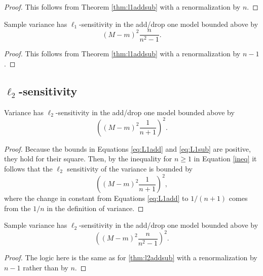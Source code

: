 \documentclass[11pt]{scrartcl} %
\begin{document}
 \begin{proof}
This follows from Theorem \ref{thm:l1addsub} with a renormalization by $n$.
\end{proof}

 \begin{corollary}
 \label{cor:l1addsub}
	Sample variance has $\ell_1$-sensitivity in the add/drop one model bounded above by
	$$\left( M-m \right)^2 \frac{n}{n^2 - 1}. $$
 \end{corollary}
 
 \begin{proof}
This follows from Theorem \ref{thm:l1addsub} with a renormalization by $n-1$.
\end{proof}

\subsection{$\ell_2$-sensitivity}

\begin{theorem}
\label{thm:l2addsub}
Variance has $\ell_2$-sensitivity in the add/drop one model bounded above by
	$$ \left( \left( M-m \right)^2 \frac{1}{n+1} \right)^2.$$
\end{theorem}

\begin{proof}
Because the bounds in Equations \ref{eq:L1add} and \ref{eq:L1sub} are positive, they hold for their square. Then, by the inequality for $n \ge 1$ in Equation \ref{ineq} it follows that the $\ell_2$ sensitivity of the variance is bounded by 
$$
\left( \left( M-m \right)^2 \frac{1}{n+1} \right)^2,
$$
where the change in constant from Equations \ref{eq:L1add} to $1/(n+1)$ comes from the $1/n$ in the definition of variance.
\end{proof}

\begin{corollary}
Sample variance has $\ell_2$-sensitivity in the add/drop one model bounded above by
	$$ \left( \left( M-m \right)^2 \frac{n}{n^2 - 1} \right)^2.$$
\end{corollary}

\begin{proof}
The logic here is the same as for \ref{thm:l2addsub} with a renormalization by $n-1$ rather than by $n$.
\end{proof}



\end{document}
